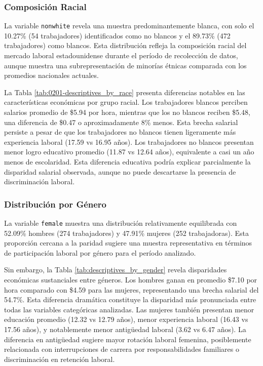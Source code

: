 \documentclass[12pt]{article}
\begin{document}





\subsubsection*{Composición Racial}

La variable \texttt{nonwhite} revela una muestra predominantemente blanca, con solo el 10.27\% (54 trabajadores) identificados como no blancos y el 89.73\% (472 trabajadores) como blancos. Esta distribución refleja la composición racial del mercado laboral estadounidense durante el período de recolección de datos, aunque muestra una subrepresentación de minorías étnicas comparada con los promedios nacionales actuales.

La Tabla \ref{tab:0201-descriptives_by_race} presenta diferencias notables en las características económicas por grupo racial. Los trabajadores blancos perciben salarios promedio de \$5.94 por hora, mientras que los no blancos reciben \$5.48, una diferencia de \$0.47 o aproximadamente 8\% menos. Esta brecha salarial persiste a pesar de que los trabajadores no blancos tienen ligeramente más experiencia laboral (17.59 vs 16.95 años). Los trabajadores no blancos presentan menor logro educativo promedio (11.87 vs 12.64 años), equivalente a casi un año menos de escolaridad. Esta diferencia educativa podría explicar parcialmente la disparidad salarial observada, aunque no puede descartarse la presencia de discriminación laboral.

\subsubsection*{Distribución por Género}

La variable \texttt{female} muestra una distribución relativamente equilibrada con 52.09\% hombres (274 trabajadores) y 47.91\% mujeres (252 trabajadoras). Esta proporción cercana a la paridad sugiere una muestra representativa en términos de participación laboral por género para el período analizado.

Sin embargo, la Tabla \ref{tab:descriptives_by_gender} revela disparidades económicas sustanciales entre géneros. Los hombres ganan en promedio \$7.10 por hora comparado con \$4.59 para las mujeres, representando una brecha salarial del 54.7\%. Esta diferencia dramática constituye la disparidad más pronunciada entre todas las variables categóricas analizadas. Las mujeres también presentan menor educación promedio (12.32 vs 12.79 años), menor experiencia laboral (16.43 vs 17.56 años), y notablemente menor antigüedad laboral (3.62 vs 6.47 años). La diferencia en antigüedad sugiere mayor rotación laboral femenina, posiblemente relacionada con interrupciones de carrera por responsabilidades familiares o discriminación en retención laboral.
\end{document}
